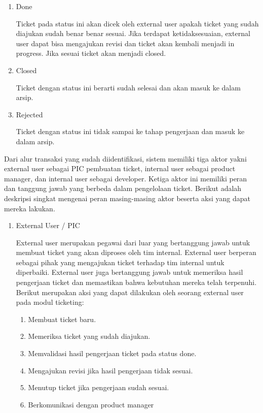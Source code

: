 \documentclass[12pt]{article}
\begin{document}
\begin{enumerate}[label=\textbf{4.\arabic*.}]
\begin{enumerate}[label=\textbf{4.1.\arabic*.}, wide, labelwidth=!, labelindent=0pt]
\begin{enumerate}[label=\arabic*.]
            \item Done
            
            Ticket pada status ini akan dicek oleh external user apakah ticket yang sudah diajukan sudah benar benar sesuai. Jika terdapat ketidaksesuaian, external user dapat bisa mengajukan revisi dan ticket akan kembali menjadi in progress. Jika sesuai ticket akan menjadi closed.
            
            \item Closed
            
            Ticket dengan status ini berarti sudah selesai dan akan masuk ke dalam arsip.
            
            \item Rejected
            
            Ticket dengan status ini tidak sampai ke tahap pengerjaan dan masuk ke dalam arsip.
        \end{enumerate}

        Dari alur transaksi yang sudah diidentifikasi, sistem memiliki tiga aktor yakni external user sebagai PIC pembuatan ticket, internal user sebagai product manager, dan internal user sebagai developer. Ketiga aktor ini memiliki peran dan tanggung jawab yang berbeda dalam pengelolaan ticket. Berikut adalah deskripsi singkat mengenai peran masing-masing aktor beserta aksi yang dapat mereka lakukan.

        \begin{enumerate}[label=\arabic*.]
            \item External User / PIC
            
            External user merupakan pegawai dari luar yang bertanggung jawab untuk membuat ticket yang akan diproses oleh tim internal. External user berperan sebagai pihak yang mengajukan ticket terhadap tim internal untuk diperbaiki. External user juga bertanggung jawab untuk memeriksa hasil pengerjaan ticket dan memastikan bahwa kebutuhan mereka telah terpenuhi. Berikut merupakan aksi yang dapat dilakukan oleh seorang external user pada modul ticketing:
            \begin{enumerate}
                \item Membuat ticket baru.
                \item Memeriksa ticket yang sudah diajukan.
                \item Memvalidasi hasil pengerjaan ticket pada status done.
                \item Mengajukan revisi jika hasil pengerjaan tidak sesuai.
                \item Menutup ticket jika pengerjaan sudah sesuai.
                \item Berkomunikasi dengan product manager
            \end{enumerate}


\end{enumerate}
\end{enumerate}
\end{enumerate}
\end{document}

